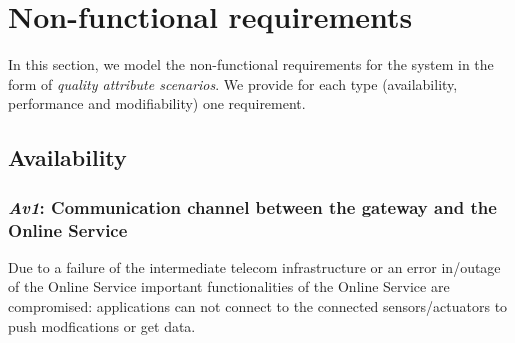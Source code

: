 \documentclass[english]{sareport}
\begin{document}
\chapter{Non-functional requirements}\label{sec:non-functional}
In this section, we model the non-functional requirements for the system in the
form of \emph{quality attribute scenarios}. We provide for each type
(availability, performance and modifiability) one requirement.

\section{Availability}
\subsection{\emph{Av1}: Communication channel between the gateway and the Online Service}
Due to a failure of the intermediate telecom infrastructure or an error in/outage of the Online Service important functionalities of the Online Service are compromised: applications can not connect to the connected sensors/actuators to push modfications or get data.
\end{document}
